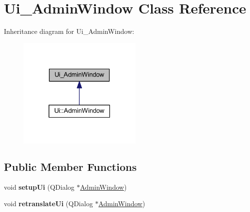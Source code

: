 \hypertarget{class_ui___admin_window}{}\section{Ui\+\_\+\+Admin\+Window Class Reference}
\label{class_ui___admin_window}


Inheritance diagram for Ui\+\_\+\+Admin\+Window\+:
\nopagebreak
\begin{figure}[H]
\begin{center}
\leavevmode
\includegraphics[width=174pt]{class_ui___admin_window__inherit__graph}
\end{center}
\end{figure}
\subsection*{Public Member Functions}
\begin{DoxyCompactItemize}
\item 
\mbox{\label{class_ui___admin_window_a66b389d6b188fbaca3e2e8af08e373e0}} 
void {\bfseries setup\+Ui} (Q\+Dialog $\ast$\mbox{\hyperlink{class_admin_window}{Admin\+Window}})
\item 
\mbox{\label{class_ui___admin_window_a2c1707ce7053e1f0924398e5638b6dda}} 
void {\bfseries retranslate\+Ui} (Q\+Dialog $\ast$\mbox{\hyperlink{class_admin_window}{Admin\+Window}})
\end{DoxyCompactItemize}
